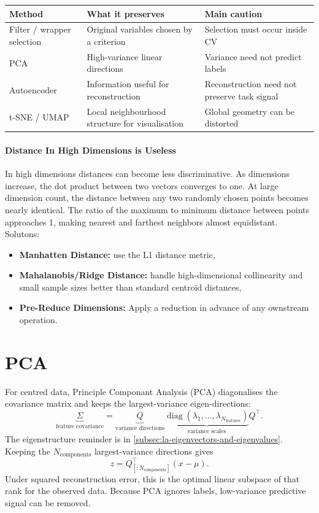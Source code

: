 \begin{tabularx}{\linewidth}{@{}L{.20\linewidth}YY@{}}
    \toprule
    Method & What it preserves & Main caution \\
    \midrule
    Filter / wrapper selection & Original variables chosen by a criterion & Selection must occur inside CV \\
    PCA & High-variance linear directions & Variance need not predict labels \\
    Autoencoder & Information useful for reconstruction & Reconstruction need not preserve task signal \\
    t-SNE / UMAP & Local neighbourhood structure for visualisation & Global geometry can be distorted \\
    \bottomrule
\end{tabularx}


\paragraph{Distance In High Dimensions is Useless}
In high dimensions distances can become less discriminative. 
As dimensions increase, the dot product between two vectors converges to one. 
At large dimension count, the distance between any two randomly chosen points becomes nearly identical. 
The ratio of the maximum to minimum distance between points approaches 1, making nearest and farthest neighbors almost equidistant.
Solutons:
\begin{itemize}
    \item \textbf{Manhatten Distance:} use the L1 distance metric,
    \item \textbf{Mahalanobis/Ridge Distance:} handle high-dimensional collinearity and small sample sizes better than standard centroid distances,
    \item \textbf{Pre-Reduce Dimensions:} Apply a reduction in advance of any ownstream operation.
\end{itemize}


\section{PCA}
\label{sec:representation-pca-an-eigenvector-view}
For centred data, Principle Componant Analysis (PCA) diagonalises the covariance matrix and keeps the largest-variance eigen-directions:
\begin{equation}
    \underbrace{\Sigma}_{\text{feature covariance}}
    =
    \underbrace{Q}_{\text{variance directions}}
    \underbrace{\operatorname{diag}(\lambda_1,\ldots,\lambda_{N_{\text{features}}})}_{\text{variance scales}}
    Q^\top
    .
\end{equation}
The eigenstructure reminder is in \cref{subsec:la-eigenvectors-and-eigenvalues}.
Keeping the $N_{\text{components}}$ largest-variance directions gives
\[
    z
    =
    Q_{[:N_{\text{components}}]}^\top
    (x-\mu).
\]
Under squared reconstruction error, this is the optimal linear subspace of that rank for the observed data.
Because PCA ignores labels, low-variance predictive signal can be removed.

